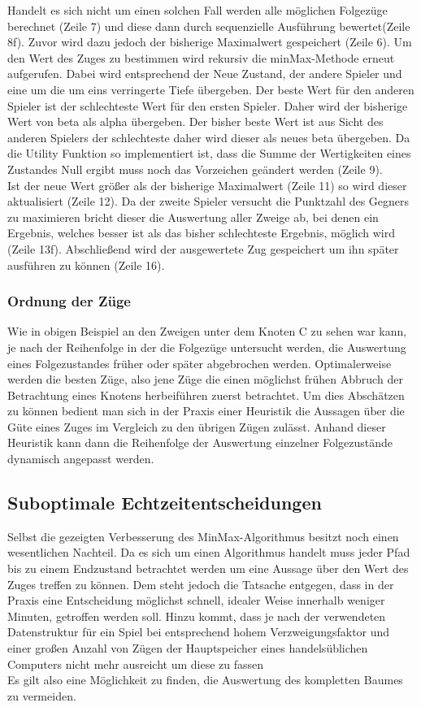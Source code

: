 Handelt es sich nicht um einen solchen Fall werden alle möglichen Folgezüge berechnet (Zeile 7) und diese dann durch sequenzielle Ausführung bewertet(Zeile 8f). Zuvor wird dazu jedoch der bisherige Maximalwert gespeichert (Zeile 6).
Um den Wert des Zuges zu bestimmen wird rekursiv die minMax-Methode erneut aufgerufen. Dabei wird entsprechend der Neue Zustand, der andere Spieler und eine um die um eins verringerte Tiefe übergeben. Der beste Wert für den anderen Spieler ist der schlechteste Wert für den ersten Spieler. Daher wird der bisherige Wert von beta als alpha übergeben. Der bisher beste Wert ist aus Sicht des anderen Spielers der schlechteste daher wird dieser als neues beta übergeben. Da die Utility Funktion so implementiert ist, dass die Summe der Wertigkeiten eines Zustandes Null ergibt muss noch das Vorzeichen geändert werden (Zeile 9).\\
Ist der neue Wert größer als der bisherige Maximalwert (Zeile 11) so wird dieser aktualisiert (Zeile 12).
Da der zweite Spieler versucht die Punktzahl des Gegners zu maximieren bricht dieser die Auswertung aller Zweige ab, bei denen ein Ergebnis, welches besser ist als das bisher schlechteste Ergebnis, möglich wird (Zeile 13f).
Abschließend wird der ausgewertete Zug gespeichert um ihn später ausführen zu können (Zeile 16).
\subsubsection{Ordnung der Züge}
Wie in obigen Beispiel an den Zweigen unter dem Knoten C zu sehen war kann, je nach der Reihenfolge in der die Folgezüge untersucht werden, die Auswertung eines Folgezustandes früher oder später abgebrochen werden. Optimalerweise werden die besten Züge, also jene Züge die einen möglichst frühen Abbruch der Betrachtung eines Knotens herbeiführen zuerst betrachtet. Um dies Abschätzen zu können bedient man sich in der Praxis einer Heuristik die Aussagen über die Güte eines Zuges im Vergleich zu den übrigen Zügen zulässt. Anhand dieser Heuristik kann dann die Reihenfolge der Auswertung einzelner Folgezustände dynamisch angepasst werden.

\subsection{Suboptimale Echtzeitentscheidungen}
Selbst die gezeigten Verbesserung des MinMax-Algorithmus besitzt noch einen wesentlichen Nachteil. Da es sich um einen  Algorithmus handelt muss jeder Pfad bis zu einem Endzustand betrachtet werden um eine Aussage über den Wert des Zuges treffen zu können. Dem steht jedoch die Tatsache entgegen, dass in der Praxis eine Entscheidung möglichst schnell, idealer Weise innerhalb weniger Minuten, getroffen werden soll. Hinzu kommt, dass je nach der verwendeten Datenstruktur für ein Spiel bei entsprechend hohem Verzweigungsfaktor und einer großen Anzahl von Zügen der Hauptspeicher eines handelsüblichen Computers nicht mehr ausreicht um diese zu fassen\\
Es gilt also eine Möglichkeit zu finden, die Auswertung des kompletten Baumes zu vermeiden.

